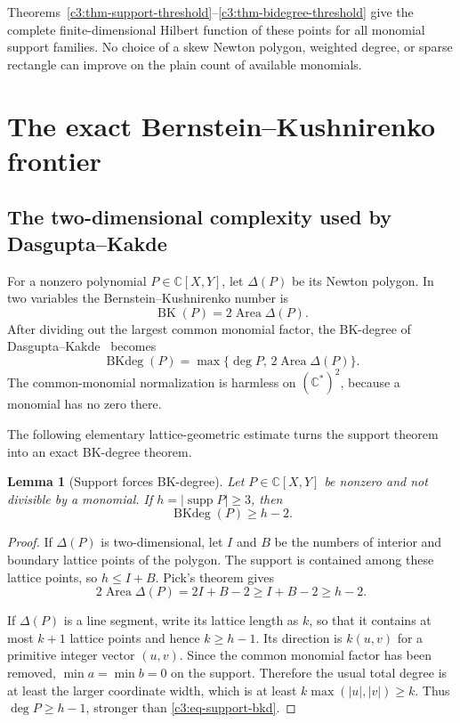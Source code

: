 \documentclass[11pt,oneside]{article}
\newtheorem{lemma}[theorem]{Lemma}
\theoremstyle{definition}
\theoremstyle{remark}
\newcommand{\C}{\mathbb C}
\newcommand{\supp}{\operatorname{supp}}
\newcommand{\BK}{\operatorname{BK}}
\newcommand{\BKd}{\operatorname{BKdeg}}
\begin{document}
Theorems~\ref{c3:thm-support-threshold}--\ref{c3:thm-bidegree-threshold} give the complete
finite-dimensional Hilbert function of these points for all monomial support families.  No
choice of a skew Newton polygon, weighted degree, or sparse rectangle can improve on the
plain count of available monomials.

\section{The exact Bernstein--Kushnirenko frontier}
\label{sec:bkfrontier}

\subsection{The two-dimensional complexity used by Dasgupta--Kakde}

For a nonzero polynomial $P\in\C[X,Y]$, let $\Delta(P)$ be its Newton polygon.  In two
variables the Bernstein--Kushnirenko number is
\[
 \BK(P)=2\operatorname{Area}\Delta(P).
\]
After dividing out the largest common monomial factor, the BK-degree of
Dasgupta--Kakde~\cite{DasguptaKakde2026} becomes
\begin{equation}
 \BKd(P)=\max\{\deg P,\,2\operatorname{Area}\Delta(P)\}.
 \label{c3:eq-bkd2}
\end{equation}
The common-monomial normalization is harmless on $(\C^*)^2$, because a monomial has no
zero there.

The following elementary lattice-geometric estimate turns the support theorem into an exact
BK-degree theorem.

\begin{lemma}[Support forces BK-degree]
\label{c3:lem-support-bkd}
Let $P\in\C[X,Y]$ be nonzero and not divisible by a monomial.  If
$h=|\supp P|\ge3$, then
\begin{equation}
 \BKd(P)\ge h-2.
 \label{c3:eq-support-bkd}
\end{equation}
\end{lemma}

\begin{proof}
If $\Delta(P)$ is two-dimensional, let $I$ and $B$ be the numbers of interior and boundary
lattice points of the polygon.  The support is contained among these lattice points, so
$h\le I+B$.  Pick's theorem gives
\[
 2\operatorname{Area}\Delta(P)=2I+B-2\ge I+B-2\ge h-2.
\]

If $\Delta(P)$ is a line segment, write its lattice length as $k$, so that it contains at most
$k+1$ lattice points and hence $k\ge h-1$.  Its direction is $k(u,v)$ for a primitive
integer vector $(u,v)$.  Since the common monomial factor has been removed,
$\min a=\min b=0$ on the support.  Therefore the usual total degree is at least the larger
coordinate width, which is at least $k\max(|u|,|v|)\ge k$.  Thus
$\deg P\ge h-1$, stronger than \eqref{c3:eq-support-bkd}.
\end{proof}
\end{document}
